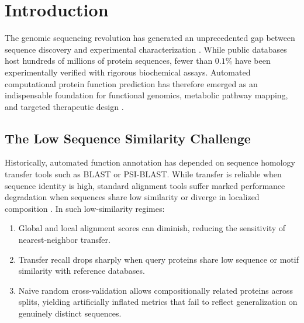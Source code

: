 \documentclass[twocolumn,10pt]{article}
\begin{document}
\section{Introduction}

The genomic sequencing revolution has generated an unprecedented gap between sequence discovery and experimental characterization \cite{uniprot2023}. While public databases host hundreds of millions of protein sequences, fewer than $0.1\%$ have been experimentally verified with rigorous biochemical assays. Automated computational protein function prediction has therefore emerged as an indispensable foundation for functional genomics, metabolic pathway mapping, and targeted therapeutic design \cite{radivojac2013large, jiang2016expanded, zhou2019cafa}.

\subsection{The Low Sequence Similarity Challenge}
Historically, automated function annotation has depended on sequence homology transfer tools such as BLAST or PSI-BLAST. While transfer is reliable when sequence identity is high, standard alignment tools suffer marked performance degradation when sequences share low similarity or diverge in localized composition \cite{rost1999twilight}. In such low-similarity regimes:
\begin{enumerate}
    \item Global and local alignment scores can diminish, reducing the sensitivity of nearest-neighbor transfer.
    \item Transfer recall drops sharply when query proteins share low sequence or motif similarity with reference databases.
    \item Naive random cross-validation allows compositionally related proteins across splits, yielding artificially inflated metrics that fail to reflect generalization on genuinely distinct sequences.
\end{enumerate}
\end{document}

